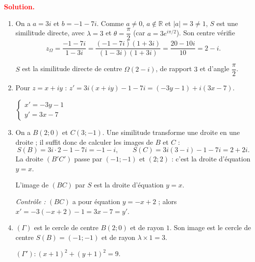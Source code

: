 \documentclass[12pt,a4paper]{article}
\newcommand{\R}{\mathbb{R}}
\newcommand{\zO}{z_{\Omega}}
\newcommand{\solution}{\par\smallskip\noindent\textbf{\textcolor{red}{Solution.}}\par}
\begin{document}
\solution
\begin{enumerate}
  \item On a $a=3i$ et $b=-1-7i$. Comme $a\neq0$, $a\notin\R$ et $|a|=3\neq1$, $S$ est une similitude directe, avec
  $\lambda=3$ et $\theta=\dfrac{\pi}{2}$ (car $a=3e^{i\pi/2}$). Son centre vérifie
  \[
  \zO=\frac{-1-7i}{1-3i}=\frac{(-1-7i)(1+3i)}{(1-3i)(1+3i)}=\frac{20-10i}{10}=2-i .
  \]
  \begin{resultat}
  $S$ est la similitude directe de centre $\Omega(2-i)$, de rapport $3$ et d'angle $\dfrac{\pi}{2}$.
  \end{resultat}
  \item Pour $z=x+iy$ : $z'=3i(x+iy)-1-7i=(-3y-1)+i(3x-7)$.
  \begin{resultat}
  $\begin{cases}x'=-3y-1\\ y'=3x-7\end{cases}$
  \end{resultat}
  \item On a $B(2;0)$ et $C(3;-1)$. Une similitude transforme une droite en une droite ; il suffit donc de calculer les images de $B$ et $C$ :
  \[
  S(B)=3i\cdot2-1-7i=-1-i,\qquad S(C)=3i(3-i)-1-7i=2+2i .
  \]
  La droite $(B'C')$ passe par $(-1;-1)$ et $(2;2)$ : c'est la droite d'équation $y=x$.
  \begin{resultat}
  L'image de $(BC)$ par $S$ est la droite d'équation $y=x$.
  \end{resultat}
  \emph{Contrôle :} $(BC)$ a pour équation $y=-x+2$ ; alors $x'=-3(-x+2)-1=3x-7=y'$.
  \item $(\Gamma)$ est le cercle de centre $B(2;0)$ et de rayon $1$. Son image est le cercle de centre $S(B)=(-1;-1)$ et de rayon $\lambda\times1=3$.
  \begin{resultat}
  $(\Gamma') : (x+1)^2+(y+1)^2=9$.
  \end{resultat}
\end{enumerate}
\end{document}
